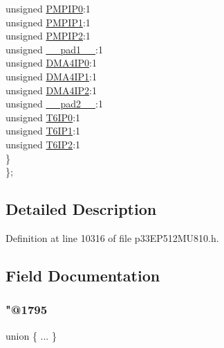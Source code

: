 \begin{DoxyCompactItemize}
\begin{tabbing}
\>\>unsigned \hyperlink{structtag_i_p_c11_b_i_t_s_ad4502269aac4e34976710630dd849e97}{PMPIP0}:1\\
\>\>unsigned \hyperlink{structtag_i_p_c11_b_i_t_s_ac498ee15e8b1a67de158823f9cc16e52}{PMPIP1}:1\\
\>\>unsigned \hyperlink{structtag_i_p_c11_b_i_t_s_a65dde80ae5a9a3ecbe21023cd103681a}{PMPIP2}:1\\
\>\>unsigned \hyperlink{structtag_i_p_c11_b_i_t_s_acaf2d0924a107ec6e8d2e31febaf66f9}{\_\_pad1\_\_}:1\\
\>\>unsigned \hyperlink{structtag_i_p_c11_b_i_t_s_ae27f166e82fb3c672188e70fdf31fb56}{DMA4IP0}:1\\
\>\>unsigned \hyperlink{structtag_i_p_c11_b_i_t_s_aa74e3500d77eec71a11ecf3ef501ef55}{DMA4IP1}:1\\
\>\>unsigned \hyperlink{structtag_i_p_c11_b_i_t_s_a1100c7a0ca4b82e75e29982e68ed0e59}{DMA4IP2}:1\\
\>\>unsigned \hyperlink{structtag_i_p_c11_b_i_t_s_a4d97cc5f7d51d22fc2bf3eab35c9cb7f}{\_\_pad2\_\_}:1\\
\>\>unsigned \hyperlink{structtag_i_p_c11_b_i_t_s_aa7c430e1f913b4ec7d9d7488378f601c}{T6IP0}:1\\
\>\>unsigned \hyperlink{structtag_i_p_c11_b_i_t_s_a7e52c63983862ea211733625e404ae34}{T6IP1}:1\\
\>\>unsigned \hyperlink{structtag_i_p_c11_b_i_t_s_a402ec6c1a1467bd35faa306338a69082}{T6IP2}:1\\
\>\} \\
\}; \\

\end{tabbing}\end{DoxyCompactItemize}


\subsection{Detailed Description}


Definition at line 10316 of file p33\+E\+P512\+M\+U810.\+h.



\subsection{Field Documentation}
\mbox{\label{structtag_i_p_c11_b_i_t_s_a7d0dbb27d0af78d7936b7ebf6db99a9d}} 
\subsubsection{\texorpdfstring{"@1795}{@1795}}
{\footnotesize\ttfamily union \{ ... \} }

